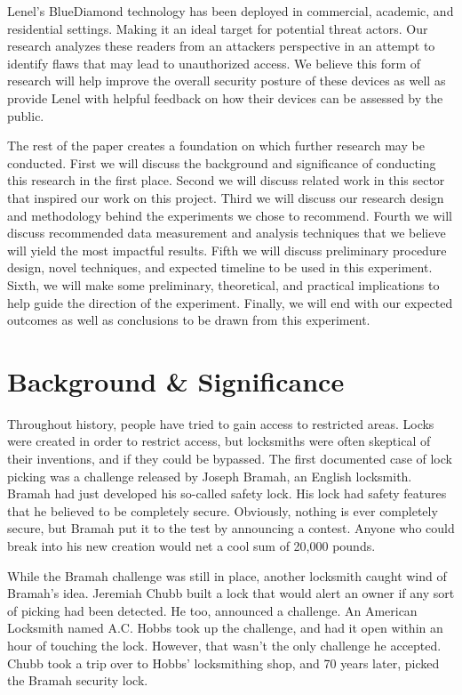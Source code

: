 \documentclass[10pt,twocolumn,letterpaper]{article}
\begin{document}
Lenel's BlueDiamond technology has been deployed in commercial, academic, and residential settings. Making it an ideal target for potential threat actors. Our research analyzes these readers from an attackers perspective in an attempt to identify flaws that may lead to unauthorized access. We believe this form of research will help improve the overall security posture of these devices as well as provide Lenel with helpful feedback on how their devices can be assessed by the public.

The rest of the paper creates a foundation on which further research may be conducted. First we will discuss the background and significance of conducting this research in the first place. Second we will discuss related work in this sector that inspired our work on this project. Third we will discuss our research design and methodology behind the experiments we chose to recommend. Fourth we will discuss recommended data measurement and analysis techniques that we believe will yield the most impactful results. Fifth we will discuss preliminary procedure design, novel techniques, and expected timeline to be used in this experiment. Sixth, we will make some preliminary, theoretical, and practical implications to help guide the direction of the experiment. Finally, we will end with our expected outcomes as well as conclusions to be drawn from this experiment.

\section{Background \& Significance}
Throughout history, people have tried to gain access to restricted areas. \cite{lockpickinghistory}  Locks were created in order to restrict access, but locksmiths were often skeptical of their inventions, and if they could be bypassed.  The first documented case of lock picking was a challenge released by Joseph Bramah, an English locksmith.  Bramah had just developed his so-called safety lock.  His lock had safety features that he believed to be completely secure.  Obviously, nothing is ever completely secure, but Bramah put it to the test by announcing a contest.  Anyone who could break into his new creation would net a cool sum of 20,000 pounds.  

While the Bramah challenge was still in place, another locksmith caught wind of Bramah's idea.  Jeremiah Chubb built a lock that would alert an owner if any sort of picking had been detected.  He too, announced a challenge.  An American Locksmith named A.C. Hobbs took up the challenge, and had it open within an hour of touching the lock.  However, that wasn't the only challenge he accepted.  Chubb took a trip over to Hobbs' locksmithing shop, and 70 years later, picked the Bramah security lock.
\end{document}
